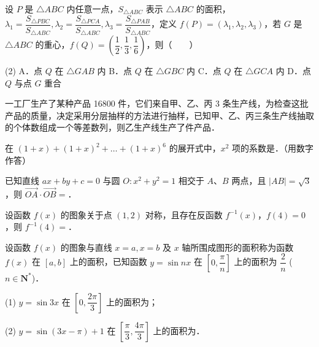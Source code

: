 \begin{question}
设 $P$ 是 $\triangle ABC$ 内任意一点，$S_{\triangle ABC}$ 表示 $\triangle ABC$ 的面积，$\lambda_1 = \dfrac{S_{\triangle PBC}}{S_{\triangle ABC}}, \lambda_2 = \dfrac{S_{\triangle PCA}}{S_{\triangle ABC}}, \lambda_3 = \dfrac{S_{\triangle PAB}}{S_{\triangle ABC}}$，定义 $f(P) = (\lambda_1, \lambda_2, \lambda_3)$，若 $G$ 是 $\triangle ABC$ 的重心，$f(Q) = \left(\dfrac{1}{2}, \dfrac{1}{3}, \dfrac{1}{6}\right)$，则\mbox{（　　）}

\begin{gkopts}(2)
\task A．点 $Q$ 在 $\triangle GAB$ 内
\task B．点 $Q$ 在 $\triangle GBC$ 内
\task C．点 $Q$ 在 $\triangle GCA$ 内
\task D．点 $Q$ 与点 $G$ 重合
\end{gkopts}

\end{question}

\begin{question}
一工厂生产了某种产品 16800 件，它们来自甲、乙、丙 3 条生产线，为检查这批产品的质量，决定采用分层抽样的方法进行抽样，已知甲、乙、丙三条生产线抽取的个体数组成一个等差数列，则乙生产线生产了\gkblank{}件产品．

\end{question}
\begin{question}
在 $(1 + x) + (1 + x)^2 + \dots + (1 + x)^6$ 的展开式中，$x^2$ 项的系数是\gkblank{}．（用数字作答）

\end{question}
\begin{question}
已知直线 $ax + by + c = 0$ 与圆 $O: x^2 + y^2 = 1$ 相交于 $A$、$B$ 两点，且 $|AB| = \sqrt{3}$，则 $\vec{OA} \cdot \vec{OB} =$\gkblank{}．

\end{question}
\begin{question}
设函数 $f(x)$ 的图象关于点 $(1, 2)$ 对称，且存在反函数 $f^{-1}(x)$，$f(4) = 0$，则 $f^{-1}(4) =$\gkblank{}．

\end{question}
\begin{question}
设函数 $f(x)$ 的图象与直线 $x = a, x = b$ 及 $x$ 轴所围成图形的面积称为函数 $f(x)$ 在 $[a, b]$ 上的面积，已知函数 $y = \sin nx$ 在 $\left[0, \dfrac{\pi}{n}\right]$ 上的面积为 $\dfrac{2}{n}$ ($n \in \mathbf{N}^*$)．

(1) $y = \sin 3x$ 在 $\left[0, \dfrac{2\pi}{3}\right]$ 上的面积为\gkblank{}；

(2) $y = \sin(3x - \pi) + 1$ 在 $\left[\dfrac{\pi}{3}, \dfrac{4\pi}{3}\right]$ 上的面积为\gkblank{}．

\end{question}

